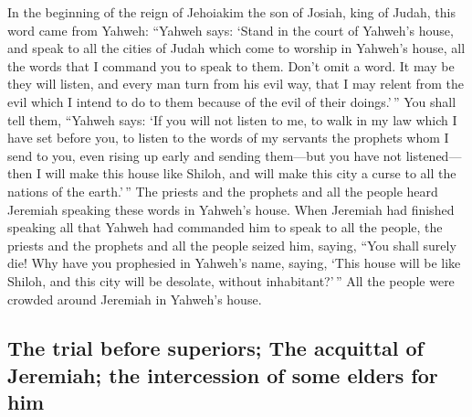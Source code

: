  In the beginning of the reign of Jehoiakim the son of
Josiah, king of Judah, this word came from Yahweh: 
``Yahweh says: `Stand in the court of Yahweh's house, and speak to all
the cities of Judah which come to worship in Yahweh's house, all the
words that I command you to speak to them. Don't omit a word.
 It may be they will listen, and every man turn from his
evil way, that I may relent from the evil which I intend to do to them
because of the evil of their doings.'\,''  You shall tell
them, ``Yahweh says: `If you will not listen to me, to walk in my law
which I have set before you,  to listen to the words of my
servants the prophets whom I send to you, even rising up early and
sending them---but you have not listened---  then I will
make this house like Shiloh, and will make this city a curse to all the
nations of the earth.'\,''  The priests and the prophets
and all the people heard Jeremiah speaking these words in Yahweh's
house.  When Jeremiah had finished speaking all that
Yahweh had commanded him to speak to all the people, the priests and the
prophets and all the people seized him, saying, ``You shall surely die!
 Why have you prophesied in Yahweh's name, saying, `This
house will be like Shiloh, and this city will be desolate, without
inhabitant?'\,'' All the people were crowded around Jeremiah in Yahweh's
house.

\hypertarget{the-trial-before-superiors-the-acquittal-of-jeremiah-the-intercession-of-some-elders-for-him}{%
\subsection{The trial before superiors; The acquittal of Jeremiah; the
intercession of some elders for
him}\label{the-trial-before-superiors-the-acquittal-of-jeremiah-the-intercession-of-some-elders-for-him}}

